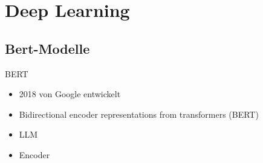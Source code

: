 \documentclass[aspectratio=169]{beamer} %
\begin{document}
\section{Deep Learning}

\subsection{Bert-Modelle}

\begin{frame}{BERT}
    \begin{itemize}
        \item 2018 von Google entwickelt
        \item Bidirectional encoder representations from transformers (BERT)
        \item LLM
        \item Encoder
    \end{itemize}
\end{frame}
\end{document}
